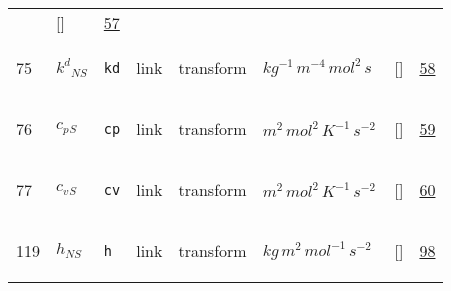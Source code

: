 \begin{longtable}{|p{1cm}|p{3cm}|p{3cm}|p{7cm}|p{3.0cm}|p{3cm}|p{2cm}|p{1cm}|}
             & []
             & \hyperlink{"e:57"}{ 57 }
                 \\
    75
             & \hypertarget{"v:75"}{ $ {k^{d}}{_{{N S}}} $}
             & \verb|kd|
             & link
             & \begin{lay}transform \end{lay}
             & $ kg^{-1} \,m^{-4} \,mol^{2} \,s \, $
             & []
             & \hyperlink{"e:58"}{ 58 }
                 \\
    76
             & \hypertarget{"v:76"}{ $ {c_p}{_{S}} $}
             & \verb|cp|
             & link
             & \begin{lay}transform \end{lay}
             & $ m^{2} \,mol^{2} \,K^{-1} \,s^{-2} \, $
             & []
             & \hyperlink{"e:59"}{ 59 }
                 \\
    77
             & \hypertarget{"v:77"}{ $ {c_v}{_{S}} $}
             & \verb|cv|
             & link
             & \begin{lay}transform \end{lay}
             & $ m^{2} \,mol^{2} \,K^{-1} \,s^{-2} \, $
             & []
             & \hyperlink{"e:60"}{ 60 }
                 \\
    119
             & \hypertarget{"v:119"}{ $ {h}{_{{N S}}} $}
             & \verb|h|
             & link
             & \begin{lay}transform \end{lay}
             & $ kg \,m^{2} \,mol^{-1} \,s^{-2} \, $
             & []
             & \hyperlink{"e:98"}{ 98 }
                 \\
    \end{longtable}